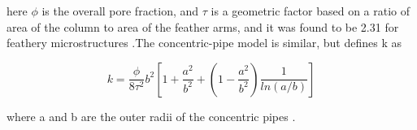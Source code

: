 \documentclass[%
 aip,
 amsmath,amssymb,
 reprint,%
]{revtex4-1}
\begin{document}
\noindent here $\phi$ is the overall pore fraction, and $\tau$ is a geometric factor based on a ratio of area of the column to area of the feather arms, and it was found to be 2.31 for feathery microstructures \cite{Naraparaju2019}.The concentric-pipe model is similar, but defines k as

\begin{equation}
    k=\frac{\phi}{8\tau^2}b^2\left[1+\frac{a^2}{b^2}+\left(1-\frac{a^2}{b^2}\right)\frac{1}{ln\left(a/b\right)}\right]
    \label{eq:CPM}
\end{equation}

\noindent where a and b are the outer radii of the concentric pipes \cite{Naraparaju2019}. 

\nocite{*}
\end{document}

